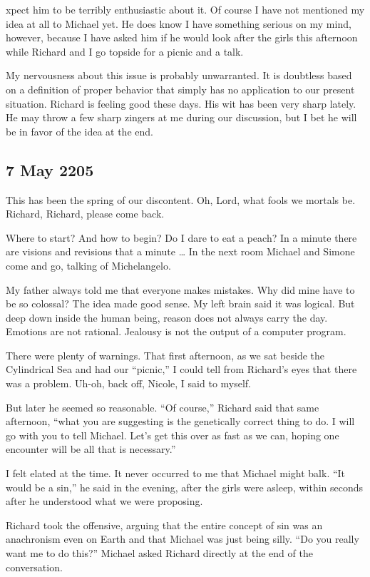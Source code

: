 \documentclass[]{article}
\begin{document}
xpect him to be terribly enthusiastic about it.  Of course I have not mentioned my idea at all to Michael yet.  He does know I have something serious on my mind, however, because I have asked him if he would look after the girls this afternoon while Richard and I go topside for a picnic and a talk.

My nervousness about this issue is probably unwarranted.  It is doubtless based on a definition of proper behavior that simply has no application to our present situation.  Richard is feeling good these days.  His wit has been very sharp lately.  He may throw a few sharp zingers at me during our discussion, but I bet he will be in favor of the idea at the end.

\subsection*{7 May 2205}

This has been the spring of our discontent.  Oh, Lord, what fools we mortals be.  Richard, Richard, please come back.

Where to start? And how to begin? Do I dare to eat a peach? In a minute there are visions and revisions that a minute … In the next room Michael and Simone come and go, talking of Michelangelo.

My father always told me that everyone makes mistakes.  Why did mine have to be so colossal? The idea made good sense.  My left brain said it was logical.  But deep down inside the human being, reason does not always carry the day.  Emotions are not rational.  Jealousy is not the output of a computer program.

There were plenty of warnings.  That first afternoon, as we sat beside the Cylindrical Sea and had our “picnic,” I could tell from Richard’s eyes that there was a problem.  Uh-oh, back off, Nicole, I said to myself.

But later he seemed so reasonable.  “Of course,” Richard said that same afternoon, “what you are suggesting is the genetically correct thing to do.  I will go with you to tell Michael.  Let’s get this over as fast as we can, hoping one encounter will be all that is necessary.”

I felt elated at the time.  It never occurred to me that Michael might balk.  “It would be a sin,” he said in the evening, after the girls were asleep, within seconds after he understood what we were proposing.

Richard took the offensive, arguing that the entire concept of sin was an anachronism even on Earth and that Michael was just being silly.  “Do you really want me to do this?” Michael asked Richard directly at the end of the conversation.
\end{document}
